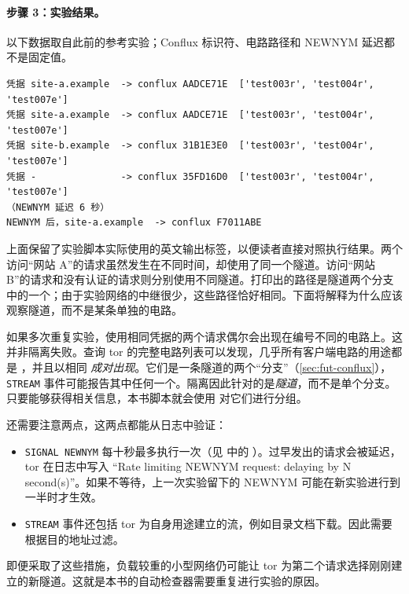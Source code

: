\paragraph{步骤 3：实验结果。}以下数据取自此前的参考实验；Conflux 标识符、电路路径和 NEWNYM 延迟都不是固定值。
\begin{lstlisting}[numbers=none]
凭据 site-a.example  -> conflux AADCE71E  ['test003r', 'test004r', 'test007e']
凭据 site-a.example  -> conflux AADCE71E  ['test003r', 'test004r', 'test007e']
凭据 site-b.example  -> conflux 31B1E3E0  ['test003r', 'test004r', 'test007e']
凭据 -               -> conflux 35FD16D0  ['test003r', 'test004r', 'test007e']
（NEWNYM 延迟 6 秒）
NEWNYM 后，site-a.example  -> conflux F7011ABE
\end{lstlisting}
上面保留了实验脚本实际使用的英文输出标签，以便读者直接对照执行结果。两个访问\enquote{网站 A}的请求虽然发生在不同时间，却使用了同一个隧道。访问\enquote{网站 B}的请求和没有认证的请求则分别使用不同隧道。打印出的路径是隧道两个分支中的一个；由于实验网络的中继很少，这些路径恰好相同。下面将解释为什么应该观察隧道，而不是某条单独的电路。

\begin{approfondimento}
如果多次重复实验，使用相同凭据的两个请求偶尔会出现在编号不同的电路上。这并非隔离失败。查询 tor 的完整电路列表可以发现，几乎所有客户端电路的用途都是 ，并且以相同  \emph{成对出现}。它们是一条隧道的两个\enquote{分支}（\cref{sec:fut-conflux}），\texttt{STREAM} 事件可能报告其中任何一个。隔离因此针对的是\emph{隧道}，而不是单个分支。只要能够获得相关信息，本书脚本就会使用  对它们进行分组。

还需要注意两点，这两点都能从日志中验证：
\begin{itemize}
  \item \texttt{SIGNAL NEWNYM} 每十秒最多执行一次（见  中的 ）。过早发出的请求会被延迟，tor 在日志中写入 \enquote{Rate limiting NEWNYM request: delaying by N second(s)}。如果不等待，上一次实验留下的 NEWNYM 可能在新实验进行到一半时才生效。
  \item \texttt{STREAM} 事件还包括 tor 为自身用途建立的流，例如目录文档下载。因此需要根据目的地址过滤。
\end{itemize}
即便采取了这些措施，负载较重的小型网络仍可能让 tor 为第二个请求选择刚刚建立的新隧道。这就是本书的自动检查器需要重复进行实验的原因。
\end{approfondimento}

